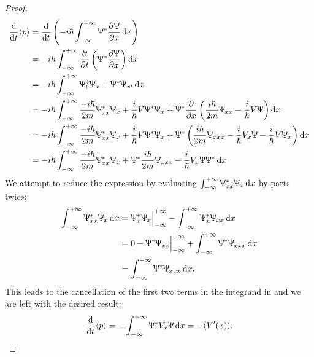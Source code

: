 \begin{proof}
\begin{subequations}
\begin{align}
\diff*{\langle p\rangle}t&=\diff*{\left(-i\hbar\intinf\ups^*\diffp{\ups}{x}\dx\right)}t\\
&=-i\hbar\intinf\diffp*{\left(\ups^*\diffp{\ups}{x}\right)}t \dx\\
&=-i\hbar\intinf\ups^*_t\ups_x+\ups^*\ups_{xt}\dx\\
&=-i\hbar\intinf\frac{-i\hbar}{2m}\ups^*_{xx}\ups_x+\frac{i}{\hbar}V\ups^*\ups_x+\ups^*\diffp*{\left(\frac{i\hbar}{2m}\ups_{xx}-\frac{i}{\hbar}V\ups\right)}x\dx\\
&=-i\hbar\intinf\frac{-i\hbar}{2m}\ups^*_{xx}\ups_x+\frac{i}{\hbar}V\ups^*\ups_x+\ups^*\left(\frac{i\hbar}{2m}\ups_{xxx}-\frac{i}{\hbar}V_x\ups-\frac{i}{\hbar}V\ups_x\right)\dx \\
&=-i\hbar\intinf\frac{-i\hbar}{2m}\ups^*_{xx}\ups_x+\ups^*\frac{i\hbar}{2m}\ups_{xxx}-\frac{i}{\hbar}V_x\ups\ups^*\dx \label{eft_f}
\end{align}
\end{subequations}
We attempt to reduce the expression by evaluating $\intinf\ups^*_{xx}\ups_x\dx$ by parts twice: 
\begin{subequations}
\begin{align}
\intinf\ups^*_{xx}\ups_x\dx&=\ups^*_x\ups_x\Big|^{+\inf}_{-\inf}-\intinf\ups^*_x\ups_{xx}\dx \\
&=0-\ups^*\ups_{xx}\Big|^{+\inf}_{-\inf}+\intinf\ups^*\ups_{xxx}\dx \\
&=\intinf\ups^*\ups_{xxx}\dx.
\end{align}
\end{subequations}
This leads to the cancellation of the first two terms in the integrand in  and we are left with the desired result: 
\begin{equation}
\diff*{\langle p\rangle}t=-\intinf\ups^*V_x\ups\dx=-\langle V'(x)\rangle. 
\end{equation}
\end{proof}
